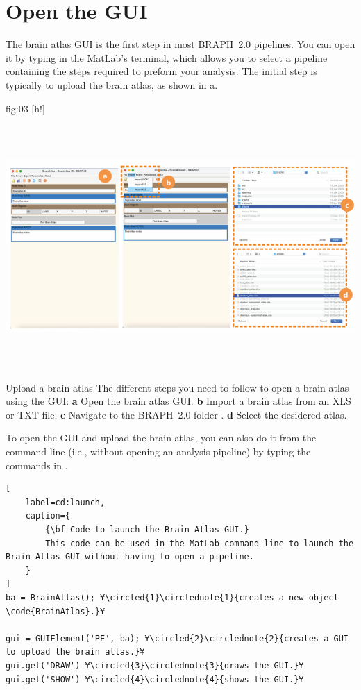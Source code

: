 \documentclass[justified]{tufte-handout}
\begin{document}
\clearpage
\section{Open the GUI}

The brain atlas GUI is the first step in most BRAPH~2.0 pipelines. You can open it by typing  in the MatLab's terminal, which allows you to select a pipeline containing the steps required to preform your analysis. The initial step is typically to upload the brain atlas, as shown in a.

	{fig:03}
	{
	[h!]
	\includegraphics[height=10cm]{tut_ba/fig03.png}
	}
	{Upload a brain atlas}
	{
	The different steps you need to follow to open a brain atlas using the GUI: 
	{\bf a} Open the brain atlas GUI.
	{\bf b} Import a brain atlas from an XLS or TXT file.
	{\bf c} Navigate to the BRAPH~2.0 folder .
	{\bf d} Select the desidered atlas.
	}

To open the GUI and upload the brain atlas, you can also do it from the command line (i.e., without opening an analysis pipeline) by typing the commands in .
%
\begin{lstlisting}[
	label=cd:launch,
	caption={
		{\bf Code to launch the Brain Atlas GUI.}
		This code can be used in the MatLab command line to launch the  Brain Atlas GUI without having to open a pipeline.
	}
]
ba = BrainAtlas(); ¥\circled{1}\circlednote{1}{creates a new object \code{BrainAtlas}.}¥

gui = GUIElement('PE', ba); ¥\circled{2}\circlednote{2}{creates a GUI to upload the brain atlas.}¥
gui.get('DRAW') ¥\circled{3}\circlednote{3}{draws the GUI.}¥
gui.get('SHOW') ¥\circled{4}\circlednote{4}{shows the GUI.}¥
\end{lstlisting}
\end{document}
